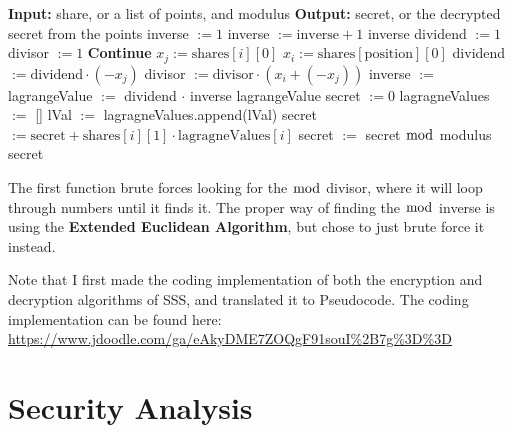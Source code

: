 \documentclass[15pt]{article}
\begin{document}
\begin{flushleft}
\begin{algorithm}[H]
\caption{Decryption}
\begin{algorithmic}[1]
\Statex \textbf{Input:} share, or a list of points, and modulus
\Statex \textbf{Output:} secret, or the decrypted secret from the points
    \State inverse $:= 1$
        \State inverse $:= \text{inverse} + 1$
    \EndWhile
    \State \Return inverse
\EndFunction
\State
    \State dividend $:= 1$
    \State divisor $:= 1$
            \State \textbf{Continue}
        \EndIf
        \State $x_j := \text{shares}[i][0]$
        \State $x_i := \text{shares}[\text{position}][0]$
        \State dividend $:= \text{dividend} \cdot (-x_j)$
        \State divisor $:= \text{divisor} \cdot (x_i + (-x_j))$
    \EndFor
    \State inverse $:=$ 
    \State lagrangeValue $:=$ dividend $\cdot$ inverse
    \State \Return lagrangeValue
\EndFunction
\State
\State secret $:= 0$
\State lagragneValues $:=$ []
    \State lVal $:=$ 
    \State lagragneValues.append(lVal)
\EndFor
{}
    \State secret $:= \text{secret} + \text{shares}[i][1] \cdot 
            \text{lagragneValues}[i]$
\EndFor
\State secret $:=$ secret $\bmod$ modulus
\State \Return secret
\end{algorithmic}
\end{algorithm}

The first function  brute forces looking for the $\bmod$
divisor, where it will loop through numbers until it finds it. The proper way of
finding the $\bmod$ inverse is using the \textbf{Extended Euclidean Algorithm},
but chose to just brute force it instead.

Note that I first made the coding implementation of both the encryption and
decryption algorithms of SSS, and translated it to Pseudocode. The coding
implementation can be found here: 
\url{https://www.jdoodle.com/ga/eAkyDME7ZOQgF91souI%2B7g%3D%3D}

\section{\textbf{Security Analysis}}


\end{flushleft}
\end{document}
